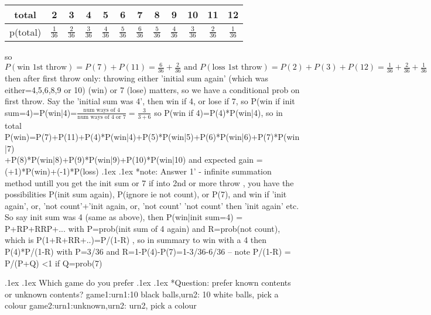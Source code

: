\documentclass[10pt,landscape,a4paper]{article}
\makeatletter
\renewcommand{\section}{\@startsection{section}{1}{0mm}%
                                {.1ex}%
                                {.1ex}%
                                {\color{blue}\sffamily\small\bfseries}}
\renewcommand{\subsection}{\@startsection{subsection}{1}{0mm}%
                                {.1ex}%
                                {.1ex}%
                                {\sffamily\bfseries}}
\makeatother
\begin{document}
\begin{multicols*}{3}
\begin{spacing}{0.1}
\begin{tabular}{|c||c|c|c|c|c|c|c|c|c|c|c|}
	\hline 
	total & 2 & 3 & 4 & 5 & 6 & 7 & 8 & 9 & 10 & 11 & 12\\ 
	\hline 
	p(total) & $\frac{1}{36}$ & $\frac{2}{36}$ & $\frac{3}{36}$ & $\frac{4}{36}$ & $\frac{5}{36}$ & $\frac{6}{36}$ & $\frac{5}{36}$ & $\frac{4}{36}$ & $\frac{3}{36}$ & $\frac{2}{36}$ & $\frac{1}{36}$\\ 
	\hline 
\end{tabular} 

	so $P(\text{win 1st throw})=P(7)+P(11)=\frac{6}{36}+\frac{2}{36} \text{ and } P(\text{loss 1st throw})=P(2)+P(3)+P(12)=\frac{1}{36}+\frac{2}{36}+\frac{1}{36}$ then after first throw only: throwing either 'initial sum again' (which was either=4,5,6,8,9 or 10) (win) or 7 (lose) matters, so we have a conditional prob on first throw.  Say the 'initial sum was 4', then win if 4, or lose if 7, so P(win if init sum=4)=P(win|4)=$\frac{\text{num ways of 4}}{\text{num ways of 4 or 7}}=\frac{3}{3+6}$ so P(win if 4)=P(4)*P(win|4), so in total P(win)=P(7)+P(11)+P(4)*P(win|4)+P(5)*P(win|5)+P(6)*P(win|6)+P(7)*P(win|7) \\ 
	+P(8)*P(win|8)+P(9)*P(win|9)+P(10)*P(win|10) and expected gain = (+1)*P(win)+(-1)*P(loss)
\subsection*{note: Answer 1' - infinite summation method untill you get the init sum or 7}
if into 2nd or more throw , you have the possibilities P(init sum again), P(ignore ie not count), or P(7), and win if 'init again', or, 'not count'+'init again, or, 'not count' 'not count' then 'init again' etc. So say init sum was 4 (same as above), then P(win|init sum=4) = P+RP+RRP+... with P=prob(init sum of 4 again) and R=prob(not count), which is P(1+R+RR+..)=P/(1-R) , so in summary to win with a 4 then P(4)*P/(1-R) with P=3/36 and R=1-P(4)-P(7)=1-3/36-6/36 -- note P/(1-R)  = P/(P+Q) <1 if Q=prob(7)


\section{Which game do you prefer}
\subsection*{Question: prefer known contents or unknown contents?}
game1:urn1:10 black balls,urn2: 10 white balls, pick a colour
game2:urn1:unknown,urn2: urn2, pick a colour

\end{spacing}
\end{multicols*}
\end{document}
